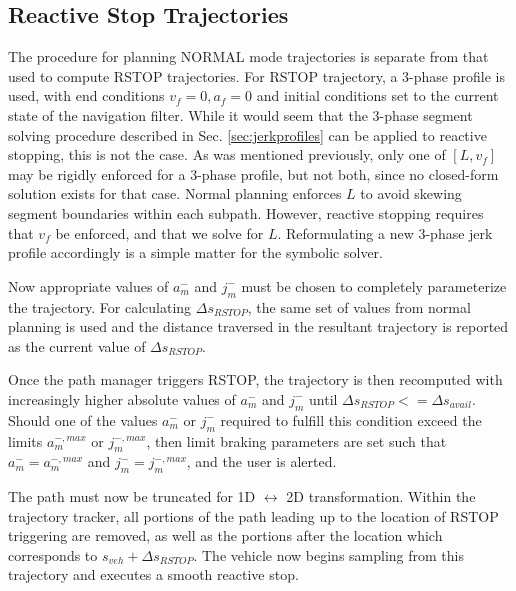 \documentclass[letterpaper, 10 pt, conference]{ieeeconf}  %
\begin{document}
\subsection{Reactive Stop Trajectories} \label{sec:reactivestoptrajectory}

The procedure for planning NORMAL mode trajectories is separate from that used to compute RSTOP trajectories.
For RSTOP trajectory, a 3-phase profile is used, with end conditions $v_f=0, a_f=0$ and initial conditions set to the current state of the navigation filter.
While it would seem that the 3-phase segment solving procedure described in Sec. 
\ref{sec:jerkprofiles} can be applied to reactive stopping, this is not the case.
As was mentioned previously, only one of $[L, v_f]$ may be rigidly enforced for a 3-phase profile, but not both, since no closed-form solution exists for that case.
Normal planning enforces $L$ to avoid skewing segment boundaries within each subpath.
However, reactive stopping requires that $v_f$ be enforced, and that we solve for $L$.
Reformulating a new 3-phase jerk profile accordingly is a simple matter for the symbolic solver.

Now appropriate values of $a_m^-$ and $j_m^-$ must be chosen to completely parameterize the trajectory.
For calculating $\Delta s_{RSTOP}$, the same set of values from normal planning is used and the distance traversed in the resultant trajectory is reported as the current value of $\Delta s_{RSTOP}$.

Once the path manager triggers RSTOP, the trajectory is then recomputed with increasingly higher absolute values of $a_m^-$ and $j_m^-$ until $\Delta s_{RSTOP} <= \Delta s_{avail}$.
Should one of the values $a_m^-$ or $j_m^-$ required to fulfill this condition exceed the limits $a_m^{-,max}$ or $j_m^{-,max}$, then limit braking parameters are set such that $a_m^-=a_m^{-,max}$ and $j_m^-=j_m^{-,max}$, and the user is alerted.

The path must now be truncated for 1D $\leftrightarrow$ 2D transformation.
Within the trajectory tracker, all portions of the path leading up to the location of RSTOP triggering are removed, as well as the portions after the location which corresponds to $s_{veh} + \Delta s_{RSTOP}$.
The vehicle now begins sampling from this trajectory and executes a smooth reactive stop.
\end{document}
